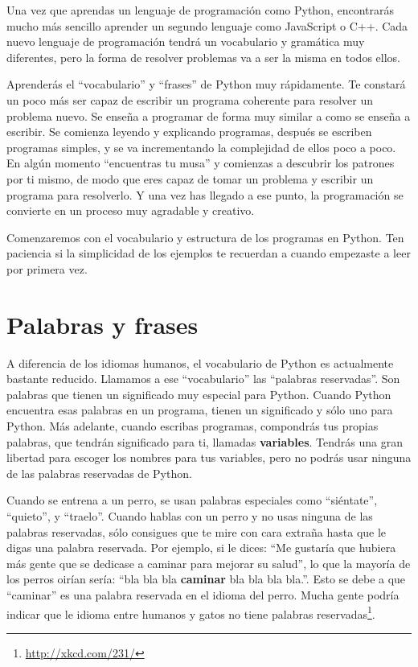 Una vez que aprendas un lenguaje de programación como Python, encontrarás
mucho más sencillo aprender un segundo lenguaje como JavaScript o C++.
Cada nuevo lenguaje de programación tendrá un vocabulario y gramática muy
diferentes, pero la forma de resolver problemas
va a ser la misma en todos ellos.

Aprenderás el ``vocabulario'' y ``frases'' de Python muy rápidamente.
Te constará un poco más ser capaz de escribir un programa coherente
para resolver un problema nuevo. Se enseña a programar de forma muy similar
a como se enseña a escribir. Se comienza leyendo y explicando programas,
después se escriben programas simples, y se va incrementando la complejidad
de ellos poco a poco. En algún momento ``encuentras tu musa'' y comienzas
a descubrir los patrones por ti mismo, de modo que eres capaz de tomar un
problema y escribir un programa para resolverlo. Y una vez has llegado a ese
punto, la programación se convierte en un proceso muy agradable y creativo.

Comenzaremos con el vocabulario y estructura de los programas en Python. Ten
paciencia si la simplicidad de los ejemplos te recuerdan a cuando empezaste
a leer por primera vez.

\section{Palabras y frases}

A diferencia de los idiomas humanos, el vocabulario de Python es actualmente
bastante reducido. Llamamos a ese ``vocabulario'' las ``palabras reservadas''.
Son palabras que tienen un significado muy especial para Python. Cuando Python
encuentra esas palabras en un programa, tienen un significado y sólo uno para Python.
Más adelante, cuando escribas programas, compondrás tus propias palabras, que tendrán significado para ti, llamadas {\bf variables}. Tendrás una gran libertad para escoger los nombres para tus variables, pero no podrás usar ninguna de las palabras reservadas de Python.

Cuando se entrena a un perro, se usan palabras especiales como
``siéntate'', ``quieto'', y ``traelo''. Cuando hablas con un perro y
no usas ninguna de las palabras reservadas, sólo consigues que te mire
con cara extraña hasta que le digas una palabra reservada.
Por ejemplo, si le dices:
``Me gustaría que hubiera más gente que se dedicase a caminar para mejorar su salud'',
lo que la mayoría de los perros oirían sería:
``bla bla bla {\bf caminar} bla bla bla bla.''.
Esto se debe a que ``caminar'' es una palabra reservada en el idioma del perro.
Mucha gente podría indicar que le idioma entre humanos y gatos no tiene
palabras reservadas\footnote{\url{http://xkcd.com/231/}}.

